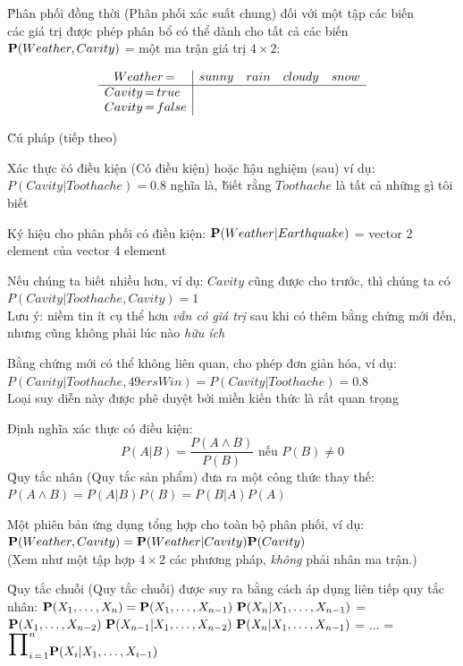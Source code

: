 \documentclass[fleqn]{article}
\begin{document}
\begin{huge}
\u{Phân phối đồng thời (Phân phối xác suất chung)} đối với một tập các biến \\
các giá trị được phép phân bổ có thể dành cho tất cả các biến\al
  $\mbox{{\bf P}}(Weather,Cavity)$ = một ma trận giá trị $4 \times 2$:

\[\begin{array}{l|cccc}
\hfil Weather \eq & sunny & rain & cloudy & snow \\
\hline
Cavity \eq true & & & & \\
Cavity \eq false & & & &
\end{array}\]



\u{Cú pháp (tiếp theo)}

Xác thực \u{có điều kiện (Có điều kiện)} hoặc \u{hậu nghiệm (sau)}\al
  ví dụ: $P(Cavity | Toothache) = 0.8$\al
  nghĩa là, \u{\u{biết rằng $Toothache$ là tất cả những gì tôi biết}}

Ký hiệu cho phân phối có điều kiện:\al
  $\mbox{{\bf P}}(Weather | Earthquake)$ = vector 2 element của vector 4 element

Nếu chúng ta biết nhiều hơn, ví dụ: $Cavity$ cũng được cho trước, thì chúng ta có\al
  $P(Cavity | Toothache,Cavity) = 1$\\
Lưu ý: niềm tin ít cụ thể hơn {\em vẫn có giá trị} sau khi có thêm bằng chứng
mới đến, nhưng cũng không phải lúc nào {\em hữu ích}

Bằng chứng mới có thể không liên quan, cho phép đơn giản hóa, ví dụ:\al
$P(Cavity | Toothache,49ersWin) = P(Cavity | Toothache) = 0.8$\\
Loại suy diễn này được phê duyệt bởi miền kiến thức là rất quan trọng


Định nghĩa xác thực có điều kiện:
\[
  P(A|B) = \frac{P(A\land B)}{P(B)} \mbox{ nếu } P(B) \neq 0
\]
\u{Quy tắc nhân (Quy tắc sản phẩm)} đưa ra một công thức thay thế:\al
  $P(A\land B) = P(A|B)P(B) = P(B|A)P(A)$

Một phiên bản ứng dụng tổng hợp cho toàn bộ phân phối, ví dụ:\al
  $\mbox{{\bf P}}(Weather,Cavity) = \mbox{{\bf P}}(Weather|Cavity) \mbox{{\bf P}}(Cavity)$\\
(Xem như một tập hợp $4\times 2$ các phương pháp, {\em không} phải nhân ma trận.)

\u{Quy tắc chuỗi (Quy tắc chuỗi)} được suy ra bằng cách áp dụng liên tiếp quy tắc nhân:\al
$\pv(X_1,\ldots,X_n) = \pv(X_1,\ldots,X_{n-1})\ 
                        \pv(X_n | X_1,\ldots,X_{n-1})$\nl
                    = $\pv(X_1,\ldots,X_{n-2})\ 
                        \pv(X_{n-1} | X_1,\ldots,X_{n-2})\ 
                        \pv(X_n | X_1,\ldots,X_{n-1})$\nl
                  = $\ldots$\nl
                  = $\myprod_{i\eq 1}^n \pv(X_i | X_1,\ldots,X_{i-1})$




\end{huge}
\end{document}
